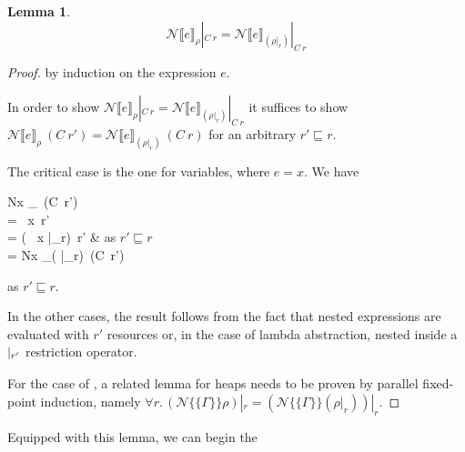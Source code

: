 \documentclass{jfp1}
\newtheorem{lemma}{Lemma}
\theoremstyle{nonumberbreak}
\newtheorem{proof}{Proof}
\newcommand{\keyword}[1]{\text{\textsf{#1}}}
\newcommand{\dsemr}[2]{\mathcal N\!\llbracket #1 \rrbracket_{#2}}
\newcommand{\esemr}[1]{\mathcal N\!\!\{\!\!\!\{#1\}\!\!\!\}}
\newcommand{\Crestr}[2]{ #1 |_{#2}}
\begin{document}
\begin{lemma}
\label{lem:denrestr}
\[
\Crestr{\dsemr{e}\rho}{C~r} = \Crestr{\dsemr{e}{(\Crestr{\rho}{r})}}{C~r}
\]
\end{lemma}
\begin{proof}
by induction on the expression $e$.


In order to show $\Crestr{\dsemr{e}\rho}{C~r} = \Crestr{\dsemr{e}{(\Crestr{\rho}{r})}}{C~r}$ it suffices to show $\dsemr{e}\rho~(C~r') = \dsemr{e}{(\Crestr{\rho}{r})}~(C~r)$ for an arbitrary $r'\sqsubseteq r$.

The critical case is the one for variables, where $e = x$. We have
\begin{conteq}[oneline]
\dsemr{x}\rho~(C~r')
\\
= \rho~x~r' \\
= (\Crestr{\rho~x}{r})~r' & as $r'\sqsubseteq r$ \\
= \dsemr{x}{(\Crestr{\rho}{r})}~(C~r')
\end{conteq}
as $r'\sqsubseteq r$.

In the other cases, the result follows from the fact that nested expressions are evaluated with $r'$ resources or, in the case of lambda abstraction, nested inside a $\Crestr \strut {r'}$ restriction operator.

For the case of \keyword{let}, a related lemma for heaps needs to be proven by parallel fixed-point induction, namely $\forall r.\, \Crestr{(\esemr{\Gamma}\rho)}r = \Crestr{(\esemr{\Gamma}{(\Crestr\rho r)})}r$.
\end{proof}

Equipped with this lemma, we can begin the
\end{document}
